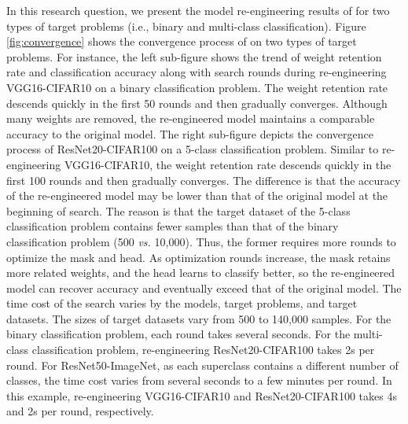 In this research question, we present the model re-engineering results of \projectName 
for two types of target problems (i.e., binary and multi-class classification).
Figure \ref{fig:convergence} shows the convergence process of \projectName on two types of target problems.
For instance, the left sub-figure shows the trend of weight retention rate and classification accuracy along with search rounds during re-engineering VGG16-CIFAR10 on a binary classification problem.
The weight retention rate descends quickly in the first 50 rounds and then gradually converges.
Although many weights are removed, the re-engineered model maintains a comparable accuracy to the original model.
The right sub-figure depicts the convergence process of ResNet20-CIFAR100 on a 5-class classification problem.
Similar to re-engineering VGG16-CIFAR10, the weight retention rate descends quickly in the first 100 rounds and then gradually converges.
The difference is that the accuracy of the re-engineered model may be lower than that of the original model at the beginning of search.
The reason is that the target dataset of the 5-class classification problem contains fewer samples than that of the binary classification problem (500 \textit{vs.} 10,000). Thus, the former requires more rounds to optimize the mask and head. As optimization rounds increase, the mask retains more related weights, and the head learns to classify better, so the re-engineered model can recover accuracy and eventually exceed that of the original model.
The time cost of the search varies by the models, target problems, and target datasets.
The sizes of target datasets vary from 500 to 140,000 samples.
For the binary classification problem, each round takes several seconds. 
For the multi-class classification problem, re-engineering ResNet20-CIFAR100 takes 2s per round.
For ResNet50-ImageNet, as each superclass contains a different number of classes, the time cost varies from several seconds to a few minutes per round.
In this example, re-engineering VGG16-CIFAR10 and ResNet20-CIFAR100 takes 4s and 2s per round, respectively.



